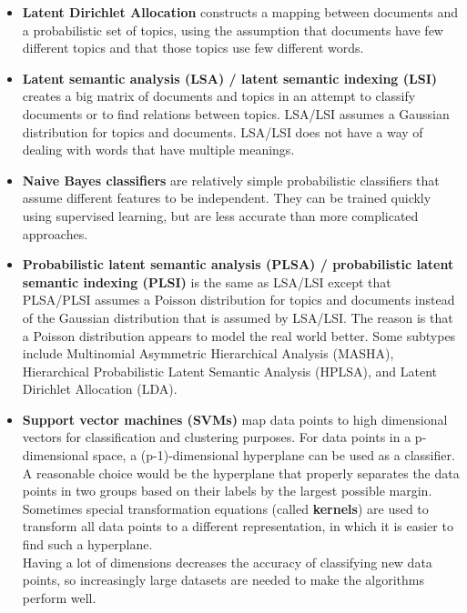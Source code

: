 \begin{itemize}
	\item \textbf{Latent Dirichlet Allocation}\cite{Blei03}
		constructs a mapping between documents and a probabilistic set of topics, using the assumption that documents have few different topics and that those topics use few different words.
	\item \textbf{Latent semantic analysis (LSA) / latent semantic indexing (LSI)}
		creates a big matrix of documents and topics in an attempt to classify documents or to find relations between topics. LSA/LSI assumes a Gaussian distribution for topics and documents. LSA/LSI does not have a way of dealing with words that have multiple meanings.
	\item \textbf{Naive Bayes classifiers}
		are relatively simple probabilistic classifiers that assume different features to be independent. They can be trained quickly using supervised learning, but are less accurate than more complicated approaches.
	\item \textbf{Probabilistic latent semantic analysis (PLSA) / probabilistic latent semantic indexing (PLSI)}
		is the same as LSA/LSI except that PLSA/PLSI assumes a Poisson distribution for topics and documents instead of the Gaussian distribution that is assumed by LSA/LSI. The reason is that a Poisson distribution appears to model the real world better. Some subtypes include Multinomial Asymmetric Hierarchical Analysis (MASHA), Hierarchical Probabilistic Latent Semantic Analysis (HPLSA), and Latent Dirichlet Allocation (LDA).
	\item \textbf{Support vector machines (SVMs)}
		map data points to high dimensional vectors for classification and clustering purposes. For data points in a p-dimensional space, a (p-1)-dimensional hyperplane can be used as a classifier. A reasonable choice would be the hyperplane that properly separates the data points in two groups based on their labels by the largest possible margin. Sometimes special transformation equations (called \textbf{kernels}) are used to transform all data points to a different representation, in which it is easier to find such a hyperplane.\\
		Having a lot of dimensions decreases the accuracy of classifying new data points, so increasingly large datasets are needed to make the algorithms perform well.
\end{itemize}

